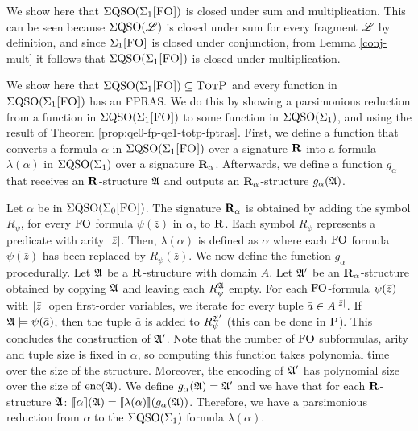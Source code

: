  We show here that $\Sigma{\rm QSO}(\Sigma_{1}\textsc{[FO]})$ is closed under sum and multiplication. This can be seen because $\Sigma{\rm QSO}(\mathscr{L})$ is closed under sum for every fragment $\mathscr{L}$ by definition, and since $\Sigma_{1}\textsc{[FO]}$ is closed under conjunction, from Lemma \ref{conj-mult} it follows that $\Sigma{\rm QSO}(\Sigma_{1}\textsc{[FO]})$ is closed under multiplication.

\vspace{1em}
  We show here that $\Sigma{\rm QSO}(\Sigma_{1}\textsc{[FO]}) \subseteq \text{\sc TotP}$ and every function in $\Sigma{\rm QSO}(\Sigma_{1}\textsc{[FO]})$ has an FPRAS. We do this by showing a parsimonious reduction from a function in $\Sigma{\rm QSO}(\Sigma_{1}\textsc{[FO]})$ to some function in $\Sigma{\rm QSO}(\Sigma_{1})$, and using the result of Theorem \ref{prop:qe0-fp-qe1-totp-fptras}. First, we define a function that converts a formula $\alpha$ in $\Sigma{\rm QSO}(\Sigma_{1}\textsc{[FO]})$ over a signature $\mathbf{R}$ into a formula $\lambda(\alpha)$ in $\Sigma{\rm QSO}(\Sigma_{1})$ over a signature $\mathbf{R}_{\alpha}$. Afterwards, we define a function $g_{\alpha}$ that receives an $\mathbf{R}$-structure $\mathfrak{A}$ and outputs an $\mathbf{R}_{\alpha}$-structure $g_{\alpha}(\mathfrak{A})$.

Let $\alpha$ be in $\Sigma{\rm QSO}(\Sigma_{0}\textsc{[FO]})$. The signature $\mathbf{R}_{\alpha}$ is obtained by adding the symbol $R_{\psi}$, for every ${\rm FO}$ formula $\psi(\bar{z})$ in $\alpha$, to $\mathbf{R}$. Each symbol $R_{\psi}$ represents a predicate with arity $\vert \bar{z} \vert$. Then, $\lambda(\alpha)$ is defined as $\alpha$ where each ${\rm FO}$ formula $\psi(\bar{z})$ has been replaced by $R_{\psi}(\bar{z})$. We now define the function $g_{\alpha}$ procedurally. Let $\mathfrak{A}$ be a $\mathbf{R}$-structure with domain $A$. Let $\mathfrak{A}'$ be an $\mathbf{R}_{\alpha}$-structure obtained by copying $\mathfrak{A}$ and leaving each $R_{\psi}^{\mathfrak{A}}$ empty. For each ${\rm FO}$-formula $\psi(\bar{z})$ with $\vert \bar{z} \vert$ open first-order variables, we iterate for every tuple $\bar{a} \in A^{\vert \bar{z} \vert}$. If $\mathfrak{A}\models\psi(\bar{a})$, then the tuple $\bar{a}$ is added to $R_{\psi}^{\mathfrak{A}'}$ (this can be done in $\text{\sc P}$). This concludes the construction of $\mathfrak{A}'$. Note that the number of ${\rm FO}$ subformulas, arity and tuple size is fixed in $\alpha$, so computing this function takes polynomial time over the size of the structure. Moreover, the encoding of $\mathfrak{A}'$ has polynomial size over the size of ${\rm enc}(\mathfrak{A})$. We define $g_{\alpha}(\mathfrak{A}) = \mathfrak{A}'$ and we have that for each $\mathbf{R}$-structure $\mathfrak{A}$: ${\llbracket{}{\alpha}\rrbracket}(\mathfrak{A}) = {\llbracket{}{\lambda(\alpha)}\rrbracket}(g_{\alpha}(\mathfrak{A}))$. Therefore, we have a parsimonious reduction from $\alpha$ to the $\Sigma{\rm QSO}(\Sigma_{1})$ formula $\lambda(\alpha)$.

